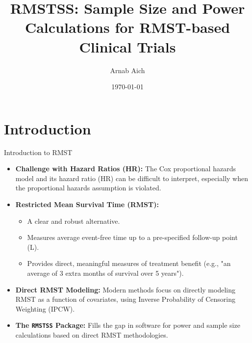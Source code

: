 \documentclass{beamer}
\title{RMSTSS: Sample Size and Power Calculations for RMST-based Clinical Trials}
\author{Arnab Aich}
\date{\today}
\begin{document}
\frame{\titlepage}

\section*{Introduction}
\begin{frame}{Introduction to RMST}
\begin{itemize}
    \item \textbf{Challenge with Hazard Ratios (HR):} The Cox proportional hazards model and its hazard ratio (HR) can be difficult to interpret, especially when the proportional hazards assumption is violated.
    \item \textbf{Restricted Mean Survival Time (RMST):}
    \begin{itemize}
        \item A clear and robust alternative.
        \item Measures average event-free time up to a pre-specified follow-up point (L).
        \item Provides direct, meaningful measures of treatment benefit (e.g., "an average of 3 extra months of survival over 5 years").
    \end{itemize}
    \item \textbf{Direct RMST Modeling:} Modern methods focus on directly modeling RMST as a function of covariates, using Inverse Probability of Censoring Weighting (IPCW).
    \item \textbf{The \texttt{RMSTSS} Package:} Fills the gap in software for power and sample size calculations based on direct RMST methodologies.
\end{itemize}
\end{frame}
\end{document}
